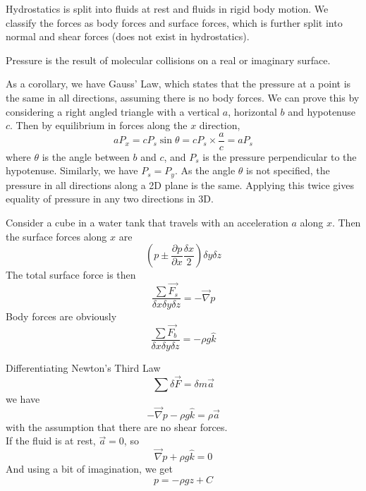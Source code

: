 \documentclass[12pt]{article}
\begin{document}
Hydrostatics is split into fluids at rest and fluids in rigid body motion. We classify the forces as body forces and surface forces, which is further split into normal and shear forces (does not exist in hydrostatics).

\begin{defn}
	Pressure is the result of molecular collisions on a real or imaginary surface.
\end{defn}

As a corollary, we have Gauss' Law, which states that the pressure at a point is the same in all directions, assuming there is no body forces. We can prove this by considering a right angled triangle with a vertical $a$, horizontal $b$ and hypotenuse $c$. Then by equilibrium in forces along the $x$ direction,
$$aP_x = cP_s\sin \theta = cP_s \times \frac{a}{c} = aP_s$$
where $\theta$ is the angle between $b$ and $c$, and $P_s$ is the pressure perpendicular to the hypotenuse. Similarly, we have $P_s = P_y$. As the angle $\theta$ is not specified, the pressure in all directions along a 2D plane is the same. Applying this twice gives equality of pressure in any two directions in 3D.

\begin{ex}
	Consider a cube in a water tank that travels with an acceleration $a$ along $x$. Then the surface forces along $x$ are
	$$\left(p \pm \frac{\partial p}{\partial x}\frac{\delta x}{2}\right) \delta y\delta z$$
	The total surface force is then
	$$\frac{\sum\vec{F_s}}{\delta x\delta y\delta z} = -\vec{\nabla}p$$
Body forces are obviously
$$\frac{\sum\vec{F_b}}{\delta x\delta y\delta z} = -\rho g\hat{k}$$

Differentiating Newton's Third Law
$$\sum\delta\vec{F} = \delta m\vec{a}$$
we have
$$-\vec{\nabla}p-\rho g\hat{k} = \rho \vec{a}$$
with the assumption that there are no shear forces. \\
If the fluid is at rest, $\vec{a}=0$, so
$$\vec{\nabla}p + \rho g\hat{k} = 0$$
And using a bit of imagination, we get
$$p = -\rho gz + C$$
\end{ex}
\end{document}
